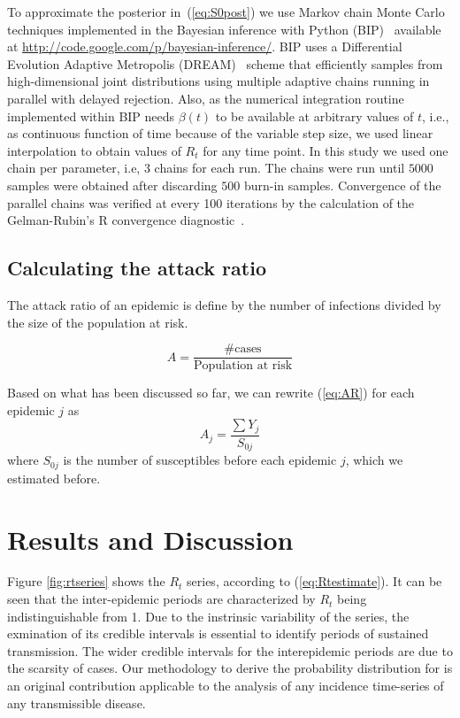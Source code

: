 To approximate the posterior in~(\ref{eq:S0post}) we use Markov chain Monte 
Carlo techniques implemented in the Bayesian inference with Python 
(BIP)~\cite{pone2011} available at  
\url{http://code.google.com/p/bayesian-inference/}.
BIP uses a Differential Evolution Adaptive Metropolis (DREAM)~\cite{vrugt2008} 
scheme that efficiently samples from high-dimensional joint distributions using 
multiple adaptive chains running in parallel with delayed rejection.
Also, as the numerical integration routine implemented within BIP needs 
$\beta(t)$ to be available at 
arbitrary values of $t$, i.e., as continuous function of time because of the 
variable step size, we used linear interpolation to obtain values of $R_t$ for 
any time point.
In this study we used one chain per parameter, i.e, 3 chains for each run.
The chains were run until $5000$ samples were obtained after discarding $500$ 
burn-in samples.
Convergence of the parallel chains was verified at every 100 iterations by the 
calculation of the Gelman-Rubin's R convergence diagnostic~\cite{brooks1998}.

\subsection*{Calculating the attack ratio}

The attack ratio of an epidemic is define by the number of infections divided 
by the size of the population at risk.

\begin{equation}
\label{eq:AR}
A=\frac{\text{\# cases}}{\text{Population at risk}} 
\end{equation}

Based on what has been discussed so far, we can rewrite (\ref{eq:AR}) for 
each epidemic $j$ as
\begin{equation}
\label{eq:AR2}
 A_{j}=\frac{\sum Y_j}{S_{0j}}
\end{equation}
where $S_{0j}$ is the number of susceptibles before each epidemic $j$, which we
estimated before.

\section*{Results and Discussion}
 
Figure \ref{fig:rtseries}  shows the $R_t$ series, according to 
(\ref{eq:Rtestimate}). 
It can be seen that the inter-epidemic periods are characterized by $R_t$ being 
indistinguishable from 1. Due to the instrinsic variability of the \rr series, 
the exmination of its credible intervals is essential to identify periods 
of sustained transmission. The wider credible intervals for the interepidemic 
periods are due to the scarsity of cases. Our methodology to derive the 
probability distribution for \rr is an original contribution applicable to the 
analysis of any incidence time-series of  any transmissible disease.

